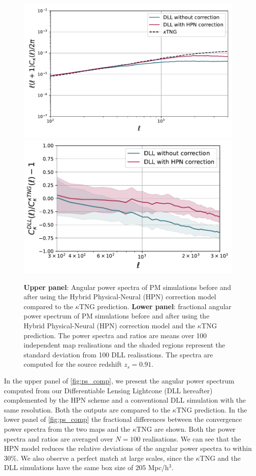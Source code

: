 \documentclass{aa}
\begin{document}
\begin{figure}
    \centering
    \includegraphics[width=0.95\columnwidth]{paper/figures/cls_DLL_vs_ktng_hpn.pdf}
        \includegraphics[width=\columnwidth]{paper/figures/res_cls_DLL_vs_ktng_hpn.pdf}
    \caption{
    \textbf{Upper panel}: Angular power spectra of PM simulations before and after using the Hybrid Physical-Neural (HPN) correction model compared to the $\kappa$TNG prediction. \textbf{Lower panel}: fractional angular power spectrum of PM simulations before and after using the Hybrid Physical-Neural (HPN) correction model and the $\kappa$TNG prediction. The power spectra and ratios are means over 100 independent map realisations and the shaded regions represent the standard deviation from 100 DLL realisations. The spectra are computed for the source redshift $z_s=0.91$. 
}
    \label{fig:ps_comp}
\end{figure}

In the upper panel of \autoref{fig:ps_comp}, we present the angular power spectrum computed from our Differentiable Lensing Lightcone (DLL hereafter) complemented by the HPN scheme and a conventional DLL simulation with the same resolution. Both the outputs are compared to the $\kappa$TNG prediction. In the lower panel  of \autoref{fig:ps_comp} the fractional differences between the convergence power spectra from the two maps and the $\kappa$TNG are shown.  Both the power spectra and ratios are averaged over $N = 100$ realisations. 
We can see that the HPN  model reduces the relative deviations of the angular power spectra to within 30\%. 
We also observe a perfect match at large scales, since the $\kappa$TNG and the DLL simulations have the same box size of 205 Mpc/h$^3$.
\end{document}
